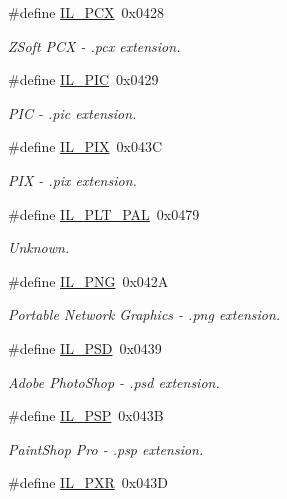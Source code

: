 \begin{DoxyCompactItemize}
\#define \hyperlink{group__il__formats_gafc747ca51da8a4f321007eabba5889cb}{I\+L\+\_\+\+P\+C\+X}~0x0428
\begin{DoxyCompactList}\small\item\em Z\+Soft P\+C\+X -\/ .pcx extension. \end{DoxyCompactList}\item 
\#define \hyperlink{group__il__formats_ga81e844eda589791e15672d7720c030c3}{I\+L\+\_\+\+P\+I\+C}~0x0429
\begin{DoxyCompactList}\small\item\em P\+I\+C -\/ .pic extension. \end{DoxyCompactList}\item 
\#define \hyperlink{group__il__formats_ga0f54e0e125c677295924a60b1c1a69cb}{I\+L\+\_\+\+P\+I\+X}~0x043\+C
\begin{DoxyCompactList}\small\item\em P\+I\+X -\/ .pix extension. \end{DoxyCompactList}\item 
\#define \hyperlink{group__il__formats_ga2369e5911ab069d0ea3dac1ce50e9ce5}{I\+L\+\_\+\+P\+L\+T\+\_\+\+P\+A\+L}~0x0479
\begin{DoxyCompactList}\small\item\em Unknown. \end{DoxyCompactList}\item 
\#define \hyperlink{group__il__formats_ga44006e952eb70685efdb82059eca4386}{I\+L\+\_\+\+P\+N\+G}~0x042\+A
\begin{DoxyCompactList}\small\item\em Portable Network Graphics -\/ .png extension. \end{DoxyCompactList}\item 
\#define \hyperlink{group__il__formats_gaf127af80b100398dc7c289538730f053}{I\+L\+\_\+\+P\+S\+D}~0x0439
\begin{DoxyCompactList}\small\item\em Adobe Photo\+Shop -\/ .psd extension. \end{DoxyCompactList}\item 
\#define \hyperlink{group__il__formats_ga4994a001d2387618290798d8460b2826}{I\+L\+\_\+\+P\+S\+P}~0x043\+B
\begin{DoxyCompactList}\small\item\em Paint\+Shop Pro -\/ .psp extension. \end{DoxyCompactList}\item 
\#define \hyperlink{group__il__formats_gac2138951f9cabdc0c190169d90165aad}{I\+L\+\_\+\+P\+X\+R}~0x043\+D

\end{DoxyCompactItemize}
